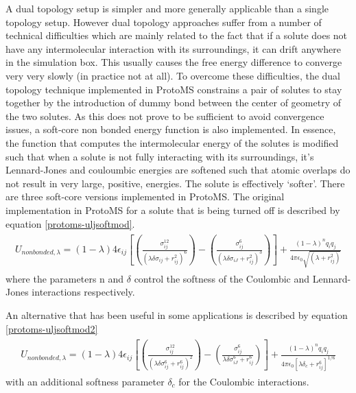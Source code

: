 \documentclass[letterpaper,10pt,english]{sphinxmanual}
\begin{document}
A dual topology setup is simpler and more generally applicable than a single topology setup. However dual topology approaches suffer from a number of technical difficulties which are mainly related to the fact that if a solute does not have any intermolecular interaction with its surroundings, it can drift anywhere in the simulation box. This usually causes the free energy difference to converge very very slowly (in practice not at all). To overcome these difficulties, the dual topology technique implemented in ProtoMS constrains a pair of solutes to stay together by the introduction of dummy bond between the center of geometry of the two solutes. As this does not prove to be sufficient to avoid convergence issues, a soft-core non bonded energy function is also implemented. In essence, the function that computes the intermolecular energy of the solutes is modified such that when a solute is not fully interacting with its surroundings, it's Lennard-Jones and couloumbic energies are softened such that atomic overlaps do not result in very large, positive, energies. The solute is effectively `softer'. There are three soft-core versions implemented in ProtoMS. The original implementation in ProtoMS for a solute
that is being turned off is described by equation \eqref{protoms-uljsoftmod}.
\label{protoms:equation-uljsoftmod}\begin{gather}
\begin{split}U_{non bonded,\lambda}= (1-\lambda) 4{\epsilon}_{ij} \left[ \left( \frac{ \sigma_{ij}^{12} }{ ( \lambda \delta \sigma_{ij} + r_{ij}^{2} )^{6}} \right) - \left( \frac{ \sigma_{ij}^{6} }{ (\lambda \delta \sigma_{iJ}  + r_{ij}^{2})^{3} } \right) \right] +  \frac{(1-\lambda)^{n} q_{i}q_{j}} {4\pi{\epsilon}_{0}\sqrt{(\lambda +  r_{ij}^{2})}}\end{split}\label{protoms-uljsoftmod}
\end{gather}
where the parameters n and \(\delta\) control the softness of the Coulombic and Lennard-Jones interactions respectively.

An alternative that has been useful in some applications is described by equation \eqref{protoms-uljsoftmod2}
\label{protoms:equation-uljsoftmod2}\begin{gather}
\begin{split}U_{non bonded,\lambda}= (1-\lambda) 4{\epsilon}_{ij} \left[  \left( \frac{ \sigma_{ij}^{12} }{ ( \lambda \delta \sigma_{ij}^6 + r_{ij}^{6} )^{2}} \right) -  \left( \frac{ \sigma_{ij}^{6} }{ \lambda \delta \sigma_{iJ}^6  + r_{ij}^{6} } \right) \right] +  \frac{(1-\lambda)^{n} q_{i}q_{j}} {4\pi{\epsilon}_{0} \left [ \lambda \delta_c +  r_{ij}^{6} \right ]^{1/6}}\end{split}\label{protoms-uljsoftmod2}
\end{gather}
with an additional softness parameter \(\delta_c\) for the Coulombic interactions.
\end{document}
